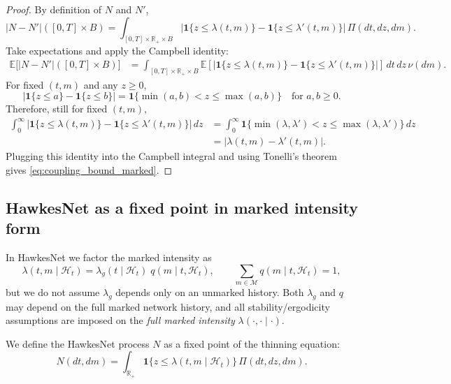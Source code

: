 \documentclass[12pt]{article}
\begin{document}
\begin{proof}
By definition of $N$ and $N'$,
\[
|N-N'|([0,T]\times B)
=
\int_{[0,T]\times\mathbb R_+\times B}
\left|\mathbf 1\{z\le \lambda(t,m)\}-\mathbf 1\{z\le \lambda'(t,m)\}\right|
\,\Pi(dt,dz,dm).
\]
Take expectations and apply the Campbell identity:
\begin{align*}
\mathbb E\bigl[|N-N'|([0,T]\times B)\bigr]
&=
\int_{[0,T]\times\mathbb R_+\times B}
\mathbb E\!\left[
\left|\mathbf 1\{z\le \lambda(t,m)\}-\mathbf 1\{z\le \lambda'(t,m)\}\right|
\right]
\,dt\,dz\,\nu(dm).
\end{align*}
For fixed $(t,m)$ and any $z\ge 0$,
\[
\left|\mathbf 1\{z\le a\}-\mathbf 1\{z\le b\}\right|
=
\mathbf 1\{ \min(a,b) < z \le \max(a,b)\}
\quad\text{for }a,b\ge 0.
\]
Therefore, still for fixed $(t,m)$,
\begin{align*}
\int_0^\infty
\left|\mathbf 1\{z\le \lambda(t,m)\}-\mathbf 1\{z\le \lambda'(t,m)\}\right|\,dz
&=
\int_0^\infty \mathbf 1\{\min(\lambda,\lambda')<z\le \max(\lambda,\lambda')\}\,dz\\
&=
\bigl|\lambda(t,m)-\lambda'(t,m)\bigr|.
\end{align*}
Plugging this identity into the Campbell integral and using Tonelli's theorem gives \eqref{eq:coupling_bound_marked}.
\end{proof}

\subsection{HawkesNet as a fixed point in marked intensity form}

In HawkesNet we factor the marked intensity as
\begin{equation}
\label{eq:lambda_factor}
\lambda(t,m\mid \mathcal H_t)
=
\lambda_g(t\mid \mathcal H_t)\; q(m\mid t,\mathcal H_t),
\qquad
\sum_{m\in\mathcal M} q(m\mid t,\mathcal H_t)=1,
\end{equation}
but we do not assume $\lambda_g$ depends only on an unmarked history.
Both $\lambda_g$ and $q$ may depend on the full marked network history, and all stability/ergodicity assumptions are imposed on the \emph{full marked intensity} $\lambda(\cdot,\cdot\mid\cdot)$.

We define the HawkesNet process $N$ as a fixed point of the thinning equation:
\begin{equation}
\label{eq:hawkesnet_fixed_point}
N(dt,dm)
=
\int_{\mathbb R_+} \mathbf 1\{z\le \lambda(t,m\mid \mathcal H_t)\}\,\Pi(dt,dz,dm).
\end{equation}
\end{document}
